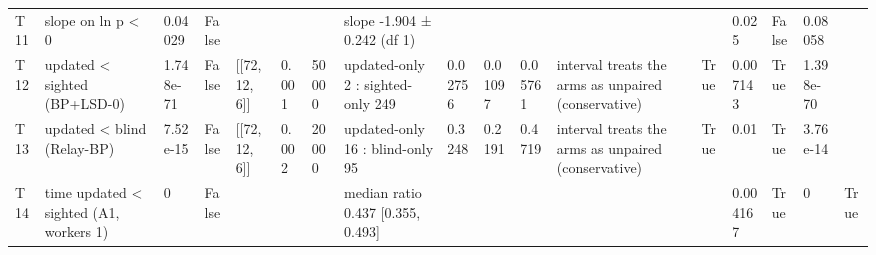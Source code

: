 \begin{tabular}{lllllllllllllllll}
T11 & slope on ln p < 0 & 0.04029 & False &  &  &  & slope -1.904 ± 0.242 (df 1) &  &  &  &  &  & 0.025 & False & 0.08058 &  \\
T12 & updated < sighted (BP+LSD-0) & 1.748e-71 & False & [[72, 12, 6]] & 0.001 & 50000 & updated-only 2 : sighted-only 249 & 0.02756 & 0.01097 & 0.05761 & interval treats the arms as unpaired (conservative) & True & 0.007143 & True & 1.398e-70 &  \\
T13 & updated < blind (Relay-BP) & 7.52e-15 & False & [[72, 12, 6]] & 0.002 & 20000 & updated-only 16 : blind-only 95 & 0.3248 & 0.2191 & 0.4719 & interval treats the arms as unpaired (conservative) & True & 0.01 & True & 3.76e-14 &  \\
T14 & time updated < sighted (A1, workers 1) & 0 & False &  &  &  & median ratio 0.437 [0.355, 0.493] &  &  &  &  &  & 0.004167 & True & 0 & True \\
\hline
\end{tabular}
